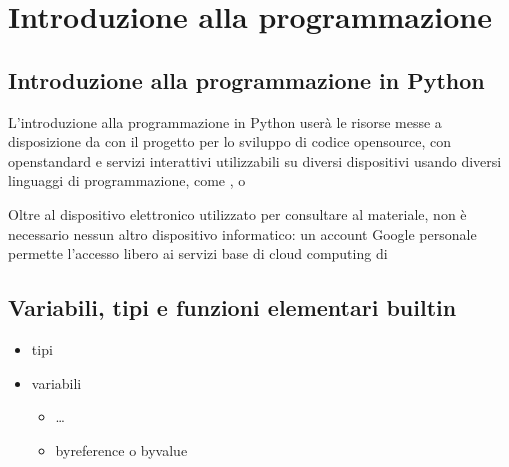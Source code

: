 \documentclass[letterpaper,10pt,italian]{jupyterBook}
\begin{document}
\sphinxstepscope


\part{Introduzione alla programmazione}

\sphinxstepscope


\chapter{Introduzione alla programmazione \sphinxhyphen{} in Python}
\label{\detokenize{ch/programming:introduzione-alla-programmazione-in-python}}\label{\detokenize{ch/programming:book-programming-intro-hs}}\label{\detokenize{ch/programming::doc}}
\sphinxAtStartPar
L’introduzione alla programmazione in Python userà le risorse messe a disposizione da  con il progetto  per lo sviluppo di codice open\sphinxhyphen{}source, con open\sphinxhyphen{}standard e servizi interattivi utilizzabili su diversi dispositivi usando diversi linguaggi di programmazione, come ,  o 

\sphinxAtStartPar
Oltre al dispositivo elettronico utilizzato per consultare al materiale, non è necessario nessun altro dispositivo informatico: un account Google personale permette l’accesso libero ai servizi base di cloud computing di 

\sphinxstepscope


\chapter{Variabili, tipi e funzioni elementari built\sphinxhyphen{}in}
\label{\detokenize{ch/programming/types:variabili-tipi-e-funzioni-elementari-built-in}}\label{\detokenize{ch/programming/types::doc}}\begin{itemize}
\item {} 
\sphinxAtStartPar
tipi

\item {} 
\sphinxAtStartPar
variabili
\begin{itemize}
\item {} 
\sphinxAtStartPar
…

\item {} 
\sphinxAtStartPar
by\sphinxhyphen{}reference o by\sphinxhyphen{}value

\end{itemize}

\end{itemize}
\end{document}
